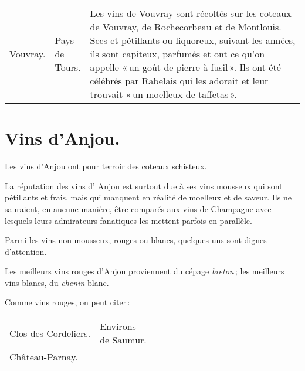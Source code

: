 \scriptsize
\begin{longtable}{m{10em}m{12em}m{12em}}                                                    
  Vouvray.                 & \makecell{Pays 
                             \\ de 
                             \\ Tours.}                     & Les vins de Vouvray sont récoltés sur les coteaux 
                                                              de Vouvray, de Rochecorbeau et de Montlouis. Secs et 
                                                              pétillants ou liquoreux, suivant les années, ils sont 
                                                              capiteux, parfumés et ont ce qu'on appelle « un goût 
                                                              de pierre à fusil ». Ils ont été célébrés par Rabelais 
                                                              qui les adorait et leur trouvait « un moelleux de 
                                                              taffetas ».                                              \\
\end{longtable}
\normalsize

\section*{\centering Vins d'Anjou.}

Les vins d'Anjou ont pour terroir des coteaux schisteux.

La réputation des vins d' Anjou est surtout due à ses vins mousseux qui sont
pétillants et frais, mais qui manquent en réalité de moelleux et de saveur. Ils
ne sauraient, en aucune manière, être comparés aux vins de Champagne avec
lesquels leurs admirateurs fanatiques les mettent parfois en parallèle.

Parmi les vins non mousseux, rouges ou blancs, quelques-uns sont dignes
d'attention.

Les meilleurs vins rouges d'Anjou proviennent du cépage \textit{breton} ; les
meilleurs vins blancs, du \textit{chenin} blanc.

Comme vins rouges, on peut citer :

\scriptsize
\begin{longtable}{m{10em}m{12em}m{12em}}                                                    
  Clos des Cordeliers.     & \makecell{Environs 
                             \\ de Saumur.}                 &                                                          \\
  Château-Parnay.          & \makecell{—}                   &                                                          \\
\end{longtable}
\normalsize

